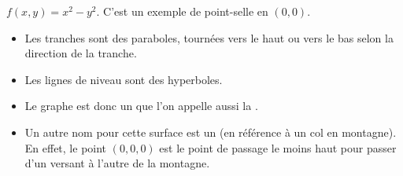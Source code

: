 \begin{exemple}{}{}
$f(x,y) = x^2 - y^2$. C'est un exemple de point-selle en $(0,0)$.

\begin{itemize}
  \item Les tranches sont des paraboles, tournées vers le haut ou vers le bas selon la direction de la tranche.
  \item Les lignes de niveau sont des hyperboles.
  \item Le graphe est donc un  que l'on appelle aussi la .
  \item Un autre nom pour cette surface est un  (en référence à un col en montagne). 
  En effet, le point $(0,0,0)$ est le point de passage le moins haut pour passer d'un versant à l'autre de la montagne. 
\end{itemize}


\end{exemple}
